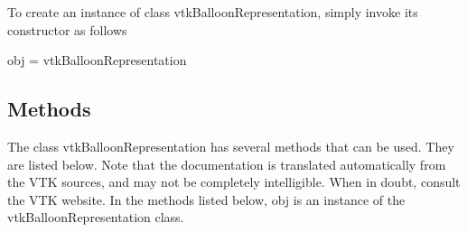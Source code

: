 To create an instance of class vtk\-Balloon\-Representation, simply invoke its constructor as follows \begin{DoxyVerb}  obj = vtkBalloonRepresentation
\end{DoxyVerb}
 \hypertarget{vtkwidgets_vtkxyplotwidget_Methods}{}\subsection{Methods}\label{vtkwidgets_vtkxyplotwidget_Methods}
The class vtk\-Balloon\-Representation has several methods that can be used. They are listed below. Note that the documentation is translated automatically from the V\-T\-K sources, and may not be completely intelligible. When in doubt, consult the V\-T\-K website. In the methods listed below, {\ttfamily obj} is an instance of the vtk\-Balloon\-Representation class. 

